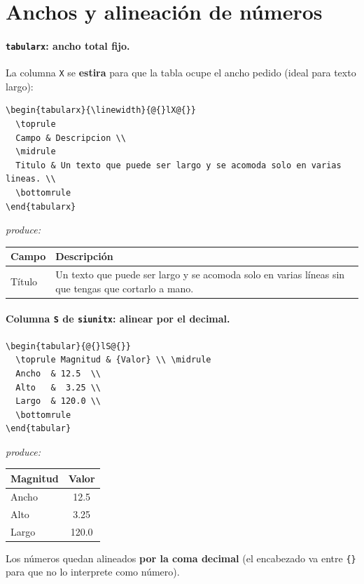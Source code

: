 \documentclass[11pt,a4paper]{article}
\newcommand{\produce}{\par\smallskip\noindent\textit{produce:}\par\smallskip}
\begin{document}
\section{Anchos y alineación de números}
\paragraph{\texttt{tabularx}: ancho total fijo.} La columna \texttt{X} se
\textbf{estira} para que la tabla ocupe el ancho pedido (ideal para texto largo):
\begin{lstlisting}
\begin{tabularx}{\linewidth}{@{}lX@{}}
  \toprule
  Campo & Descripcion \\
  \midrule
  Titulo & Un texto que puede ser largo y se acomoda solo en varias lineas. \\
  \bottomrule
\end{tabularx}
\end{lstlisting}
\produce
\begin{center}
\begin{tabularx}{\linewidth}{@{}lX@{}}
  \toprule
  Campo & Descripción \\
  \midrule
  Título & Un texto que puede ser largo y se acomoda solo en varias líneas sin
           que tengas que cortarlo a mano. \\
  \bottomrule
\end{tabularx}
\end{center}

\paragraph{Columna \texttt{S} de \texttt{siunitx}: alinear por el decimal.}
\begin{lstlisting}
\begin{tabular}{@{}lS@{}}
  \toprule Magnitud & {Valor} \\ \midrule
  Ancho  & 12.5  \\
  Alto   &  3.25 \\
  Largo  & 120.0 \\
  \bottomrule
\end{tabular}
\end{lstlisting}
\produce
\begin{center}
\begin{tabular}{@{}lS@{}}
  \toprule Magnitud & {Valor} \\ \midrule
  Ancho  & 12.5  \\
  Alto   &  3.25 \\
  Largo  & 120.0 \\
  \bottomrule
\end{tabular}
\end{center}
Los números quedan alineados \textbf{por la coma decimal} (el encabezado va entre
\texttt{\{\}} para que no lo interprete como número).
\end{document}
